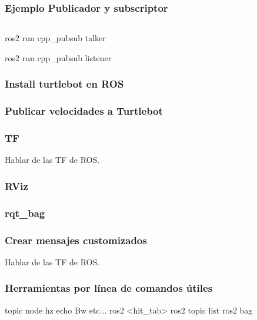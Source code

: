 \begin{frame}[fragile]
	\frametitle{Ejemplo Publicador y subscriptor}
	
    
    \begin{columns}
        \begin{column}{0.5\textwidth}
            
        \end{column}
        \begin{column}{0.5\textwidth}
            
        \end{column}
    \end{columns}
	
	ros2 run cpp\_pubsub talker
	
	ros2 run cpp\_pubsub listener
	
\end{frame}


\begin{frame}
	\frametitle{Install turtlebot en ROS}
	
\end{frame}

\begin{frame}
	\frametitle{Publicar velocidades a Turtlebot}
	
\end{frame}

\begin{frame}
	\frametitle{TF}
	Hablar de las TF de ROS.
	
\end{frame}

\begin{frame}
	\frametitle{RViz}

	
\end{frame}

\begin{frame}
    \frametitle{rqt\_bag}

    
\end{frame}

\begin{frame}
	\frametitle{Crear mensajes customizados}
	Hablar de las TF de ROS.
	
\end{frame}

\begin{frame}
	\frametitle{Herramientas por línea de comandos útiles}
    topic node hz echo Bw etc...
    ros2 <hit\_tab>
    ros2 topic list
    ros2 bag 
	
\end{frame}

